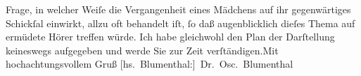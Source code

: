 \begin{ledgroupsized}[t]{13cm}
               Frage, in welcher Weiſe die Vergangenheit eines Mädchens auf ihr gegenwärtiges
               Schickſal einwirkt, allzu oft behandelt iſt, ſo daß augenblicklich dieſes Thema auf
               ermüdete Hörer treffen würde. Ich habe gleichwohl den Plan der Darſtellung keineswegs
               aufgegeben und werde Sie zur Zeit verſtändigen.\hspace*{2.5em}Mit
               hochachtungsvollem Gruß\pend
           \pstart \spacefill\mbox{{[}hs. Blumenthal:{]} Dr. Osc. Blumenthal}\pend{}\endnumbering{}\end{ledgroupsized}  \newcommand{\dateiname}{L00253}\newcommand{\titel}{Oscar Blumenthal an Arthur Schnitzler, 12. 8. 1893}\newcommand{\editorInnen}{Martin Anton Müller und Gerd-Hermann Susen}
      